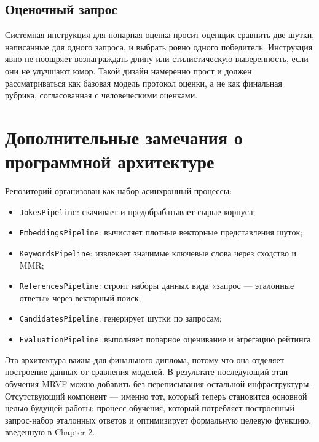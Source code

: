 \section{Оценочный запрос}

Системная инструкция для попарная оценка просит оценщик сравнить две шутки, написанные для одного запроса, и выбрать ровно одного победитель. Инструкция явно не поощряет вознаграждать длину или стилистическую выверенность, если они не улучшают юмор. Такой дизайн намеренно прост и должен рассматриваться как базовая модель протокол оценки, а не как финальная рубрика, согласованная с человеческими оценками.

\chapter{Дополнительные замечания о программной архитектуре}

Репозиторий организован как набор асинхронный процессы:
\begin{itemize}
 \item \texttt{JokesPipeline}: скачивает и предобрабатывает сырые корпуса;
 \item \texttt{EmbeddingsPipeline}: вычисляет плотные векторные представления шуток;
 \item \texttt{KeywordsPipeline}: извлекает значимые ключевые слова через сходство и MMR;
 \item \texttt{ReferencesPipeline}: строит наборы данных вида «запрос — эталонные ответы» через векторный поиск;
 \item \texttt{CandidatesPipeline}: генерирует шутки по запросам;
 \item \texttt{EvaluationPipeline}: выполняет попарное оценивание и агрегацию рейтинга.
\end{itemize}

Эта архитектура важна для финального диплома, потому что она отделяет построение данных от сравнения моделей. В результате последующий этап обучения MRVF можно добавить без переписывания остальной инфраструктуры. Отсутствующий компонент --- именно тот, который теперь становится основной целью будущей работы: процесс обучения, который потребляет построенный запрос-набор эталонных ответов и оптимизирует формальную целевую функцию, введенную в Chapter 2.
